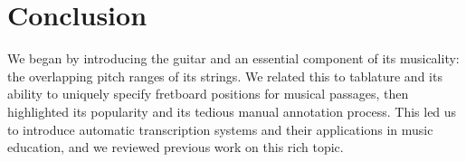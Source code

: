 \documentclass[12pt]{cmuthesis}
\begin{document}



\noindent
\chapter{Conclusion}
\label{chap:conclusion}
We began by introducing the guitar and an essential component of its musicality: the overlapping pitch ranges of its strings. We related this to tablature and its ability to uniquely specify fretboard positions for musical passages, then highlighted its popularity and its tedious manual annotation process. This led us to introduce automatic transcription systems and their applications in music education, and we reviewed previous work on this rich topic.
\end{document}
